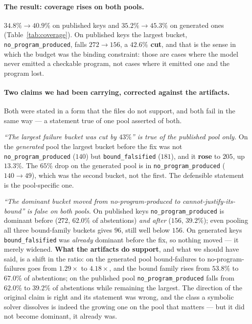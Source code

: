 \paragraph{The result: coverage rises on both pools.} $34.8\% \to 40.9\%$ on published keys and
$35.2\% \to 45.3\%$ on generated ones (Table~\ref{tab:coverage}). On published keys the largest
bucket, \texttt{no\_program\_produced}, falls $272 \to 156$, a \textbf{$42.6\%$ cut}, and that
is the sense in which the budget was the binding constraint: those are cases where the model
never emitted a checkable program, not cases where it emitted one and the program lost.

\paragraph{Two claims we had been carrying, corrected against the artifacts.} Both were stated
in a form that the files do not support, and both fail in the same way --- a statement true of
one pool asserted of both.

\emph{``The largest failure bucket was cut by $43\%$'' is true of the published pool only.} On
the \emph{generated} pool the largest bucket before the fix was not
\texttt{no\_program\_produced} ($140$) but \texttt{bound\_falsified} ($181$), and it
\textbf{rose} to $205$, up $13.3\%$. The $65\%$ drop on the generated pool is in
\texttt{no\_program\_produced} ($140 \to 49$), which was the second bucket, not the first. The
defensible statement is the pool-specific one.

\emph{``The dominant bucket moved from no-program-produced to cannot-justify-its-bound'' is
false on both pools.} On published keys \texttt{no\_program\_produced} is dominant before
($272$, $62.0\%$ of abstentions) \emph{and after} ($156$, $39.2\%$); even pooling all three
bound-family buckets gives $96$, still well below $156$. On generated keys
\texttt{bound\_falsified} was \emph{already} dominant before the fix, so nothing moved --- it
merely widened. \textbf{What the artifacts do support}, and what we should have said, is a
shift in the ratio: on the generated pool bound-failures to no-program-failures goes from
$1.29\times$ to $4.18\times$, and the bound family rises from $53.8\%$ to $67.0\%$ of
abstentions; on the published pool \texttt{no\_program\_produced} falls from $62.0\%$ to
$39.2\%$ of abstentions while remaining the largest. The direction of the original claim is
right and its statement was wrong, and the class a symbolic solver dissolves is indeed the
growing one on the pool that matters --- but it did not become dominant, it already was.


